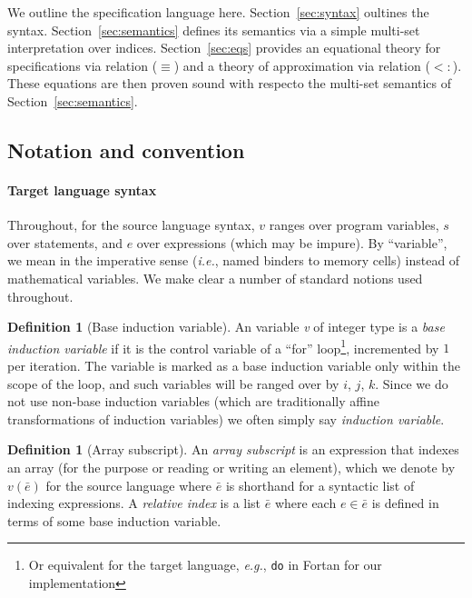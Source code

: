 \documentclass[9pt]{sigplanconf}
\newcounter{block}
\theoremstyle{definition}
\newtheorem{definition}[block]{Definition}
\newcommand{\ie}{\emph{i.e.}}
\newcommand{\eg}{\emph{e.g.}}
\begin{document}
We outline the specification language here. Section~\ref{sec:syntax}
oultines the syntax. Section~\ref{sec:semantics} defines its semantics
via a simple multi-set interpretation over indices. Section~\ref{sec:eqs} provides an
equational theory for specifications via relation ($\equiv$) and a
theory of approximation via relation ($<:$). These equations are then
proven sound with respecto the multi-set semantics of Section~\ref{sec:semantics}.

\subsection{Notation and convention}
\label{sec:notation}

\renewcommand*{\arraystretch}{0.8}
\paragraph{Target language syntax} Throughout, for the source language
syntax, $v$ ranges over program variables, $s$ over statements, and
$e$ over expressions (which may be impure).  By ``variable'', we mean
in the imperative sense (\ie{}, named binders to memory cells) instead
of mathematical variables. We make clear a number of standard notions
used throughout.

\begin{definition}[Base induction variable]
  An variable \textit{v} of integer type is a \emph{base induction
    variable} if it is the control variable of a ``for''
  loop\footnote{Or equivalent for the target language, \eg{},
    \texttt{do} in Fortan for our implementation}, incremented by $1$ per
iteration. The variable is marked as a base induction variable
only within the scope of the loop, and such variables will be ranged
over by $i$, $j$, $k$. Since we do not use non-base induction
variables (which are traditionally affine transformations of induction
variables) we often simply say \emph{induction variable}. 
\end{definition}

\begin{definition}[Array subscript]
  An \emph{array subscript} is an expression that indexes an array
  (for the purpose or reading or writing an element), which we denote
  by $v(\bar{e})$ for the source language where $\bar{e}$ is shorthand
  for a syntactic list of indexing expressions. A \emph{relative
    index} is a list $\bar{e}$ where each $e \in \bar{e}$ is defined
  in terms of some base induction variable.
\end{definition}
\end{document}

